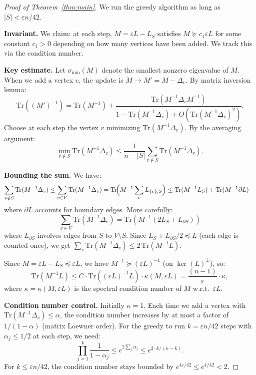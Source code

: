 \documentclass[12pt]{article}
\begin{document}
\begin{proof}[Proof of Theorem~\ref{thm:main}]
We run the greedy algorithm as long as $|S| < \varepsilon n/42$.

\medskip
\noindent\textbf{Invariant.}  We claim: at each step, $M = \varepsilon L - L_S$ satisfies $M \succeq c_1 \varepsilon L$ for some constant $c_1 > 0$ depending on how many vertices have been added.  We track this via the condition number.

\medskip
\noindent\textbf{Key estimate.}  Let $\sigma_{\min}(M)$ denote the smallest nonzero eigenvalue of $M$.  When we add a vertex $v$, the update is $M \to M' = M - \Delta_v$.  By matrix inversion lemma:
\[
  \mathrm{Tr}((M')^{-1}) = \mathrm{Tr}(M^{-1}) + \frac{\mathrm{Tr}(M^{-1}\Delta_v M^{-1})}{1 - \mathrm{Tr}(M^{-1}\Delta_v) + O(\mathrm{Tr}(M^{-1}\Delta_v)^2)}.
\]
Choose at each step the vertex $v$ minimizing $\mathrm{Tr}(M^{-1}\Delta_v)$.  By the averaging argument:
\[
  \min_{v\notin S}\mathrm{Tr}(M^{-1}\Delta_v) \leq \frac{1}{n-|S|}\sum_{v\notin S}\mathrm{Tr}(M^{-1}\Delta_v).
\]

\noindent\textbf{Bounding the sum.}  We have:
\begin{align*}
  \sum_{v\notin S}\mathrm{Tr}(M^{-1}\Delta_v)
  &\leq \sum_{v\in V}\mathrm{Tr}(M^{-1}\Delta_v)
   = \mathrm{Tr}\!\Bigl(M^{-1}\sum_{v}L_{\{v\},S}\Bigr)
   \leq \mathrm{Tr}(M^{-1} L_S) + \mathrm{Tr}(M^{-1} \partial L)
\end{align*}
where $\partial L$ accounts for boundary edges.  More carefully:
\[
  \sum_{v\in V}\mathrm{Tr}(M^{-1}\Delta_v) = \mathrm{Tr}(M^{-1}(2L_S + L_{\partial S}))
\]
where $L_{\partial S}$ involves edges from $S$ to $V\setminus S$.  Since $L_S + L_{\partial S}/2 \preceq L$ (each edge is counted once), we get $\sum_v \mathrm{Tr}(M^{-1}\Delta_v) \leq 2\,\mathrm{Tr}(M^{-1}L)$.

Since $M = \varepsilon L - L_S \preceq \varepsilon L$, we have $M^{-1} \succeq (\varepsilon L)^{-1}$ (on $\ker(L)^\perp$), so:
\[
  \mathrm{Tr}(M^{-1}L) \leq C\cdot\mathrm{Tr}((\varepsilon L)^{-1}L)\cdot\kappa(M,\varepsilon L)
  = \frac{(n-1)}{\varepsilon}\cdot\kappa,
\]
where $\kappa = \kappa(M, \varepsilon L)$ is the spectral condition number of $M$ w.r.t.\ $\varepsilon L$.

\noindent\textbf{Condition number control.}  Initially $\kappa = 1$.  Each time we add a vertex with $\mathrm{Tr}(M^{-1}\Delta_v) \leq \alpha$, the condition number increases by at most a factor of $1/(1-\alpha)$ (matrix Loewner order).  For the greedy to run $k = \varepsilon n/42$ steps with $\alpha_j \leq 1/2$ at each step, we need:
\[
  \prod_{j=1}^k \frac{1}{1-\alpha_j} \leq e^{2\sum_j \alpha_j} \leq e^{2 \cdot k/(n-k)}.
\]
For $k \leq \varepsilon n/42$, the condition number stays bounded by $e^{4\varepsilon/42} \leq e^{4/42} < 2$.


\end{proof}
\end{document}

